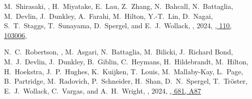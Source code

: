 
\item
M.~Shirasaki, \myself, H.~Miyatake, E.~Lau, Z.~Zhang, N.~Bahcall, N.~Battaglia, M.~Devlin, J.~Dunkley, A.~Farahi, M.~Hilton, Y.-T.~Lin, D.~Nagai, S.~T.~Staggs, T.~Sunayama, D.~Spergel, and E.~J.~Wollack,
,
2024, \href{https://ui.adsabs.harvard.edu/abs/2024arXiv240708201S}{\prd, 110, 103006},

\item
N.~C.~Robertson, \myself, M.~Asgari, N.~Battaglia, M.~Bilicki, J.~Richard Bond, M.~J.~Devlin, J.~Dunkley, B.~Giblin, C.~Heymans, H.~Hildebrandt, M.~Hilton, H.~Hoekstra, J.~P.~Hughes, K.~Kuijken, T.~Louis, M.~Mallaby-Kay, L.~Page, B.~Partridge, M.~Radovich, P.~Schneider, H.~Shan, D.~N.~Spergel, T.~Tröster, E.~J.~Wollack, C.~Vargas, and A.~H.~Wright,
,
2024, \href{https://ui.adsabs.harvard.edu/abs/2024A&A...681A..87R}{\aap, 681, A87}

